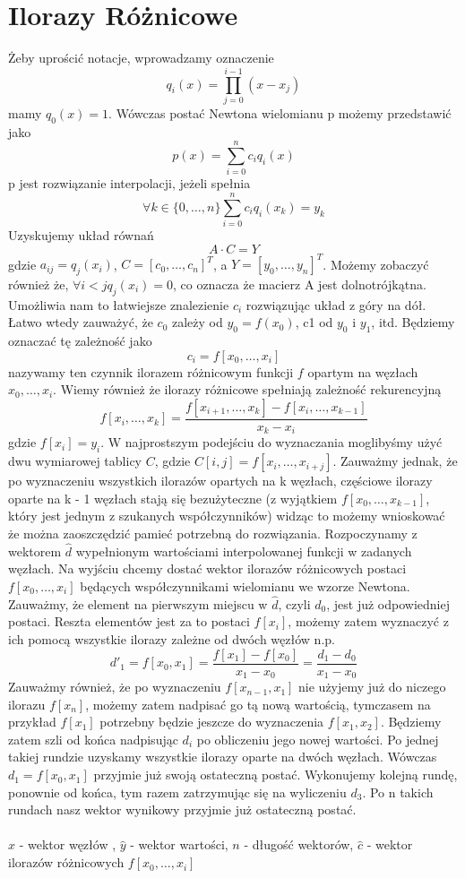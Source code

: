 \documentclass[10pt]{article}
\begin{document}
\section{Ilorazy Różnicowe}
Żeby uprościć notacje, wprowadzamy oznaczenie
\[q_i(x) = \prod_{j=0}^{i-1}(x-x_j)\]
mamy $q_0(x)=1$. Wówczas postać Newtona wielomianu p możemy przedstawić jako
\[p(x)=\sum_{i=0}^n c_i q_i(x)\]
p jest rozwiązanie interpolacji, jeżeli spełnia 
\[\forall k \in \{0,\dots,n\} \sum_{i=0}^n c_i q_i (x_k) = y_k\]
Uzyskujemy układ równań
\[A\cdot C = Y\]
gdzie $a_{ij}=q_j(x_i)$, $C = [c_0,\dots,c_n]^T$, a $Y = [y_0,\dots,y_n]^T$. Możemy zobaczyć również że, $\forall i <  j q_j(x_i)=0$, co oznacza że macierz A jest dolnotrójkątna. Umożliwia nam to łatwiejsze znalezienie $c_i$ rozwiązując układ z góry na dół. Łatwo wtedy  zauważyć, że $c_0$ zależy od $y_0 = f(x_0)$, c1 od $y_0$ i $y_1$, itd. Będziemy oznaczać tę zależność jako
\[c_i = f[x_0,\dots,x_i]\]
nazywamy ten czynnik ilorazem różnicowym funkcji $f$ opartym na węzłach $x_0,\dots,x_i$. Wiemy również że ilorazy różnicowe spełniają zależność rekurencyjną
\[f[x_i,\dots,x_k]=\frac{f[x_{i+1},\dots,x_k] - f[x_{i},\dots,x_{k-1}]}{x_k - x_i}\]
gdzie $f[x_i]=y_i$. W najprostszym podejściu do wyznaczania moglibyśmy użyć dwu wymiarowej tablicy $C$, gdzie $C[i,j]=f[x_i,\dots,x_{i+j}]$. Zauważmy jednak, że po wyznaczeniu wszystkich ilorazów opartych na k węzłach, częściowe ilorazy oparte na k - 1 węzłach stają się bezużyteczne (z wyjątkiem $f[x_0,\dots,x_{k-1}]$, który jest jednym z szukanych współczynników) widząc to możemy wnioskować że można zaoszczędzić pamieć potrzebną do rozwiązania.
Rozpoczynamy z wektorem $\hat{d}$ wypełnionym wartościami interpolowanej funkcji w zadanych węzłach. Na wyjściu chcemy dostać wektor ilorazów różnicowych postaci $f[x_0,\dots,x_i]$ będących współczynnikami wielomianu we wzorze Newtona. Zauważmy, że element na pierwszym miejscu w $ \hat{d}$, czyli $d_0$, jest już odpowiedniej postaci. Reszta elementów jest za to postaci $f[x_i]$, możemy zatem wyznaczyć z ich pomocą wszystkie ilorazy zależne od dwóch węzłów n.p.
\[d'_1 = f[x_0, x_1] = \frac{f[x_1] - f[x_0]}{x_1 - x_0} = \frac{d_1 - d_0}{x_1 - x_0}\]
Zauważmy również, że po wyznaczeniu $f[x_{n-1},x_1]$ nie użyjemy już do niczego ilorazu $f[x_n]$, możemy zatem nadpisać go tą nową wartością, tymczasem na przykład $f[x_1]$ potrzebny będzie jeszcze do wyznaczenia $f[x_1, x_2]$. Będziemy zatem szli od końca nadpisując $d_i$ po obliczeniu jego nowej wartości. Po jednej takiej rundzie uzyskamy wszystkie ilorazy oparte na dwóch węzłach. Wówczas $d_1 = f[x_0,x_1]$ przyjmie już swoją ostateczną postać. Wykonujemy kolejną rundę, ponownie od końca, tym razem zatrzymując się na wyliczeniu $d_3$. Po n takich rundach nasz wektor wynikowy przyjmie już ostateczną postać.\\\\
$\hat{x}$ - wektor węzłów , $\hat{y}$ - wektor wartości, $n$ - długość wektorów, $\hat{c}$ - wektor ilorazów różnicowych $f[x_0,\dots,x_i]$
\end{document}
